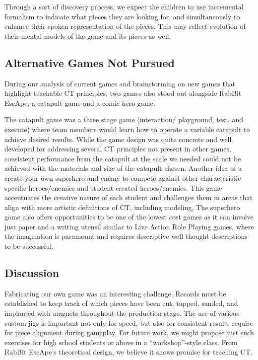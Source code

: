 \documentclass{acm_proc_article-sp}
\begin{document}
Through a sort of discovery process, we expect the children to use incremental formalism \cite{shipman1999formality} to indicate what pieces they are looking for, and simultaneously to enhance their spoken representation of the pieces. 
This may reflect evolution of their mental models of the game and its pieces as well. 

\subsection{Alternative Games Not Pursued}
\label{sec:terminated_games}
During our analysis of current games and brainstorming on new games that highlight teachable CT principles, two games also stood out alongside RabBit EscApe, a catapult game and a comic hero game.

The catapult game was a three stage game (interaction/ playground, test, and execute) where team members would learn how to operate a variable catapult to achieve desired results.
While the game design was quite concrete and well developed for addressing several CT principles not present in other games, consistent performance from the catapult at the scale we needed could not be achieved with the materials and size of the catapult chosen.
Another idea of a create-your-own superhero and enemy to compete against other characteristic specific heroes/enemies and student created heroes/enemies.
This game accentuates the creative nature of each student and challenges them in areas that align with more artistic definitions of CT, including modeling, 
The superhero game also offers opportunities to be one of the lowest cost games as it can involve just paper and a writing utensil similar to Live Action Role Playing games, where the imagination is paramount and requires descriptive well thought descriptions to be successful.

\subsection{Discussion}
\label{sec:discussion}
\sloppy Fabricating our own game was an interesting challenge.
Records must be established to keep track of which pieces have been cut, tapped, sanded, and implanted with magnets throughout the production stage.
The use of various custom jigs is important not only for speed, but also for consistent results require for piece alignment during gameplay.
For future work, we might propose just such exercises for high school students or above in a ``workshop''-style class.
From RabBit EscApe's theoretical design, we believe it shows promise for teaching CT. 
\end{document}
